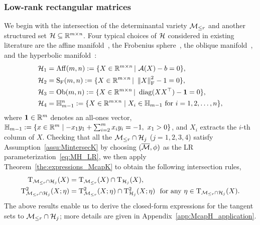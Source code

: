 \subsubsection{Low-rank rectangular matrices}\label{sec:lowrank_rectangular}
We begin with the intersection of the determinantal variety $\mathcal{M}_{\le r}$ and another structured set $\mathcal{H}\subseteq\mathbb{R}^{m\times n}$. Four typical choices of $\mathcal{H}$ considered in existing literature are the affine manifold~\cite{li2023normalboundedaffine}, the Frobenius sphere~\cite{cason2013iterative,yang2025spacedecouple,peng2025normalizedTT}, the oblique manifold~\cite{yang2025spacedecouple}, and the hyperbolic manifold~\cite{jawanpuria2019lowrankhyperbolic}:
\begin{equation}\label{eq:exampleHi}
    \begin{aligned}
        \mathcal{H}_1 &=\mathrm{Aff}(m,n):= \{X\in\mathbb{R}^{m\times n}\,|\ \mathcal{A}(X)-b={0}\},
        \\
        \mathcal{H}_2 &=\mathrm{S_F}(m,n):= \{X\in\mathbb{R}^{m\times n}\,|\ \left\| {X} \right\|^2_{\mathrm{F}}-1=0\},
        \\
        \mathcal{H}_3 &=\mathrm{Ob}(m,n):= \{X\in\mathbb{R}^{m\times n}\,|\ \operatorname{diag}(XX^\top)-{\bf 1}={0}\},
        \\
        \mathcal{H}_4 &= \mathbb{H}^n_{m-1}:=\{X\in\mathbb{R}^{m\times n}\mid X_i\in\mathbb{H}_{m-1}\ \text{for}\ i=1,2,\ldots,n\},
    \end{aligned}
\end{equation}
where ${\bf 1}\in\mathbb{R}^{m}$ denotes an all-ones vector, $\mathbb{H}_{m-1}:=\{x\in\mathbb{R}^m\mid-x_1y_1 + \sum_{i=2}^m x_iy_i=-1,\ x_1>0\}$, and $X_{i}$ extracts the $i$-th column of $X$. Checking that all the $\mathcal{M}_{\le r}\cap\mathcal{H}_j$ ($j=1,2,3,4$) satisfy Assumption~\ref{assu:MintersecK} by choosing $(\overline{\mathcal{M}},\phi)$ as the LR parameterization~\eqref{eq:MH_LR}, we then apply Theorem~\ref{the:expressions_McapK} to obtain the following intersection rules,
\begin{equation*}
\begin{aligned}
    \mathrm{T}_{\mathcal{M}_{\le r}\cap\mathcal{H}_j}(X) &= \mathrm{T}_{\mathcal{M}_{\le r}}(X)\cap\mathrm{T}_{\mathcal{H}_j}(X),
    \\
    \mathrm{T}^2_{\mathcal{M}_{\le r}\cap\mathcal{H}_j}(X;\eta) &= \mathrm{T}^2_{\mathcal{M}_{\le r}}(X;\eta)\cap\mathrm{T}^2_{\mathcal{H}_j}(X;\eta)\ \ \text{for any}\ \eta\in\mathrm{T}_{\mathcal{M}_{\le r}\cap\mathcal{H}_j}(X).
\end{aligned}
\end{equation*}
The above results enable us to derive the closed-form expressions for the tangent sets to $\mathcal{M}_{\le r}\cap\mathcal{H}_j$; more details are given in Appendix~\ref{app:McapH_application}.



